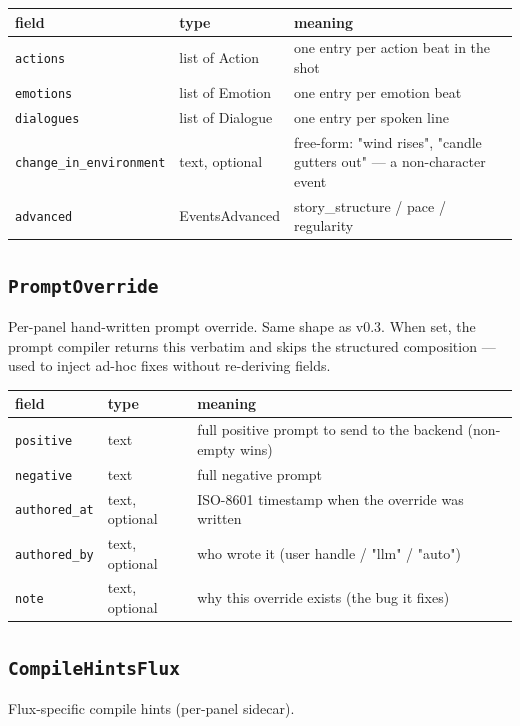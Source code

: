 \begin{longtable}{@{}R{0.24\textwidth}R{0.21\textwidth}R{0.49\textwidth}@{}}
\toprule \textbf{field} & \textbf{type} & \textbf{meaning} \\ \midrule
\endhead
\texttt{actions} & list of Action & one entry per action beat in the shot \\
\texttt{emotions} & list of Emotion & one entry per emotion beat \\
\texttt{dialogues} & list of Dialogue & one entry per spoken line \\
\texttt{change\_\allowbreak in\_\allowbreak environment} & text, optional & free-form: "wind rises", "candle gutters out" ---\allowbreak{} a non-character event \\
\texttt{advanced} & EventsAdvanced & story\_\allowbreak structure /\allowbreak{} pace /\allowbreak{} regularity \\
\bottomrule
\end{longtable}

\subsection*{\texttt{PromptOverride}}
\noindent Per-panel hand-written prompt override. Same shape as v0.3. When set, the prompt compiler returns this verbatim and skips the structured composition ---\allowbreak{} used to inject ad-hoc fixes without re-deriving fields.

\begin{longtable}{@{}R{0.24\textwidth}R{0.21\textwidth}R{0.49\textwidth}@{}}
\toprule \textbf{field} & \textbf{type} & \textbf{meaning} \\ \midrule
\endhead
\texttt{positive} & text & full positive prompt to send to the backend (non-empty wins) \\
\texttt{negative} & text & full negative prompt \\
\texttt{authored\_\allowbreak at} & text, optional & ISO-8601 timestamp when the override was written \\
\texttt{authored\_\allowbreak by} & text, optional & who wrote it (user handle /\allowbreak{} "llm" /\allowbreak{} "auto") \\
\texttt{note} & text, optional & why this override exists (the bug it fixes) \\
\bottomrule
\end{longtable}

\subsection*{\texttt{CompileHintsFlux}}
\noindent Flux-specific compile hints (per-panel sidecar).

